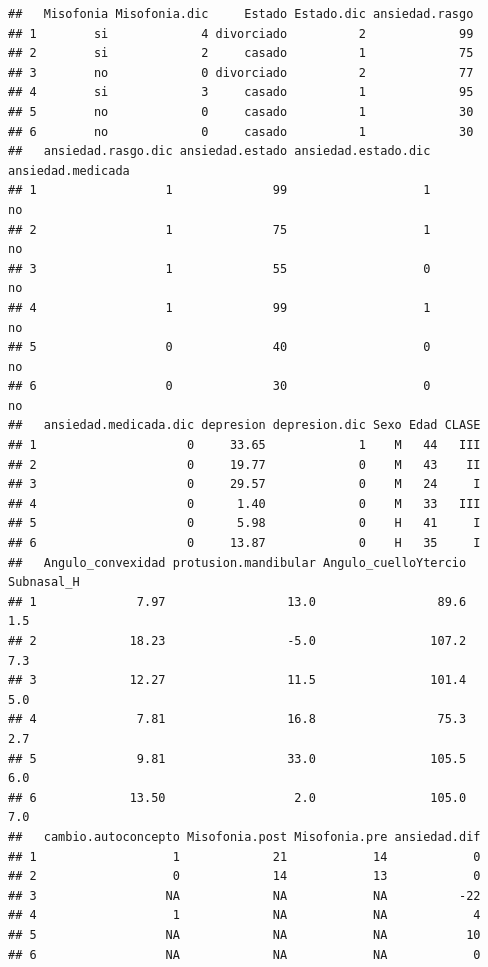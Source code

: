 \documentclass[
]{book}
\begin{document}
\begin{verbatim}
##   Misofonia Misofonia.dic     Estado Estado.dic ansiedad.rasgo
## 1        si             4 divorciado          2             99
## 2        si             2     casado          1             75
## 3        no             0 divorciado          2             77
## 4        si             3     casado          1             95
## 5        no             0     casado          1             30
## 6        no             0     casado          1             30
##   ansiedad.rasgo.dic ansiedad.estado ansiedad.estado.dic ansiedad.medicada
## 1                  1              99                   1                no
## 2                  1              75                   1                no
## 3                  1              55                   0                no
## 4                  1              99                   1                no
## 5                  0              40                   0                no
## 6                  0              30                   0                no
##   ansiedad.medicada.dic depresion depresion.dic Sexo Edad CLASE
## 1                     0     33.65             1    M   44   III
## 2                     0     19.77             0    M   43    II
## 3                     0     29.57             0    M   24     I
## 4                     0      1.40             0    M   33   III
## 5                     0      5.98             0    H   41     I
## 6                     0     13.87             0    H   35     I
##   Angulo_convexidad protusion.mandibular Angulo_cuelloYtercio Subnasal_H
## 1              7.97                 13.0                 89.6        1.5
## 2             18.23                 -5.0                107.2        7.3
## 3             12.27                 11.5                101.4        5.0
## 4              7.81                 16.8                 75.3        2.7
## 5              9.81                 33.0                105.5        6.0
## 6             13.50                  2.0                105.0        7.0
##   cambio.autoconcepto Misofonia.post Misofonia.pre ansiedad.dif
## 1                   1             21            14            0
## 2                   0             14            13            0
## 3                  NA             NA            NA          -22
## 4                   1             NA            NA            4
## 5                  NA             NA            NA           10
## 6                  NA             NA            NA            0
\end{verbatim}
\end{document}
